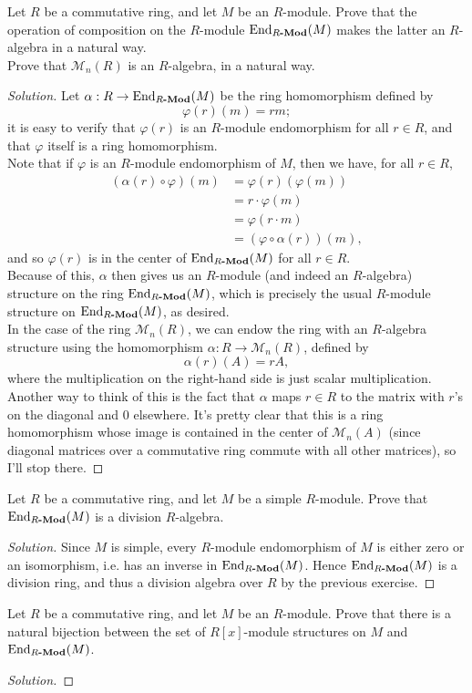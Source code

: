 \documentclass[12pt]{article}
\newenvironment{problem}[2][Problem]{\begin{trivlist}
\item[\hskip \labelsep {\bfseries #1}\hskip \labelsep {\bfseries #2.}]}{\end{trivlist}}
\newcommand{\catname}[1]{\normalfont\textbf{#1}}
\newcommand{\End}{\text{End}}
\newcommand{\Endmod}[2]{\End_{#1\catname{-Mod}}(#2)}
\newenvironment{solution}
  {\renewcommand\qedsymbol{$\blacksquare$}\begin{proof}[Solution]}
{\end{proof}}
\theoremstyle{remark}
\begin{document}
\begin{problem}{5.9}
  Let $R$ be a commutative ring, and let $M$ be an $R$-module.
  Prove that the operation of composition on the $R$-module $\Endmod{R}{M}$
  makes the latter an $R$-algebra in a natural way.\\
  \indent Prove that $\mathcal{M}_n(R)$ is an $R$-algebra, in a natural way.
\end{problem}
\begin{solution}
  Let $\alpha:R\to\Endmod{R}{M}$ be the ring homomorphism defined by
  \begin{equation*}
    \varphi(r)(m) = rm;
  \end{equation*}
  it is easy to verify that $\varphi(r)$ is an $R$-module endomorphism for
  all $r\in R$, and that $\varphi$ itself is a ring homomorphism. \\
  \indent Note that if $\varphi$ is an $R$-module endomorphism of $M$,
  then we have, for all $r\in R$,
  \begin{align*}
    (\alpha(r)\circ\varphi)(m) &= \varphi(r)(\varphi(m))\\
    &= r\cdot\varphi(m)\\
    &= \varphi(r\cdot m)\\
    &= (\varphi\circ\alpha(r))(m),
  \end{align*}
  and so $\varphi(r)$ is in the center of $\Endmod{R}{M}$ for all $r\in R$. \\
  Because of this, $\alpha$ then gives us an $R$-module (and indeed
  an $R$-algebra) structure on the ring $\Endmod{R}{M}$, which is precisely
  the usual $R$-module structure on $\Endmod{R}{M}$, as desired. \\
  \indent In the case of the ring $\mathcal{M}_n(R)$, we can endow the ring
  with an $R$-algebra structure using the homomorphism 
  $\alpha:R\to\mathcal{M}_n(R)$, defined by
  \begin{equation*}
    \alpha(r)(A) = rA,
  \end{equation*}
  where the multiplication on the right-hand side is just scalar 
  multiplication.
  Another way to think of this is the fact that $\alpha$ maps $r\in R$
  to the matrix with $r$'s on the diagonal and $0$ elsewhere.
  It's pretty clear that this is a ring homomorphism whose image is contained
  in the center of $\mathcal{M}_n(A)$ (since diagonal matrices over a
  commutative ring commute with all other matrices), so I'll stop there.
\end{solution}

\begin{problem}{5.10}
  Let $R$ be a commutative ring, and let $M$ be a simple $R$-module.
  Prove that $\Endmod{R}{M}$ is a division $R$-algebra.
\end{problem}
\begin{solution}
  Since $M$ is simple, every $R$-module endomorphism of $M$
  is either zero or an isomorphism, i.e. has an inverse in 
  $\Endmod{R}{M}$.
  Hence $\Endmod{R}{M}$ is a division ring, and thus a division
  algebra over $R$ by the previous exercise.
\end{solution}

\begin{problem}{5.11}
  Let $R$ be a commutative ring, and let $M$ be an $R$-module.
  Prove that there is a natural bijection between the set of
  $R[x]$-module structures on $M$ and $\Endmod{R}{M}$.
\end{problem}
\begin{solution}
  
\end{solution}<++>
\end{document}

